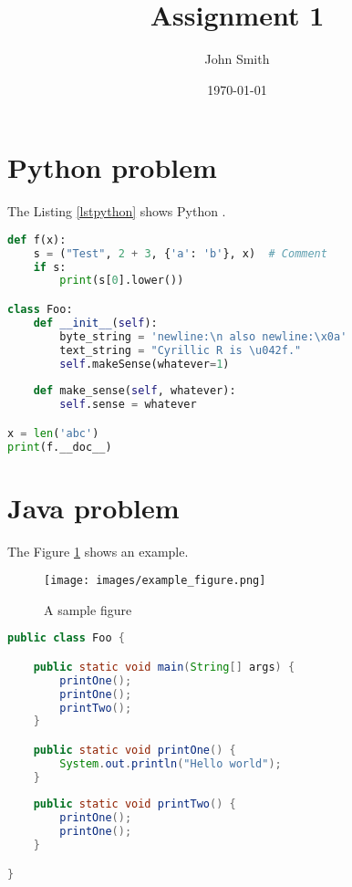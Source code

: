 \documentclass{assignment}
\institute{University of Caen}
\date{\today}
\author{John Smith}
\title{Assignment 1}
\begin{document}
\thispagestyle{plain}

\makeheader

\section{Python problem}

The Listing \ref{lstpython} shows Python .

\begin{lstlisting}[language=Python, caption=Sample Python script with highlighting, label=lstpython]
def f(x):
	s = ("Test", 2 + 3, {'a': 'b'}, x)  # Comment
	if s:
		print(s[0].lower())

class Foo:
	def __init__(self):
		byte_string = 'newline:\n also newline:\x0a'
		text_string = "Cyrillic R is \u042f."
		self.makeSense(whatever=1)
	
	def make_sense(self, whatever):
		self.sense = whatever

x = len('abc')
print(f.__doc__)
\end{lstlisting}

\lipsum[1]

\section{Java problem}

\lipsum[2]

The Figure \ref{exemple} shows an example.

\begin{figure}[H]
\centering
\texttt{[image: images/example\_figure.png]}
\caption{A sample figure}
\label{exemple}
\end{figure}

\lipsum[3]

\begin{lstlisting}[language=Java, caption=Sample Java script]
public class Foo {

    public static void main(String[] args) {
        printOne();
        printOne();
        printTwo();
    }

    public static void printOne() {
        System.out.println("Hello world");
    }
    
    public static void printTwo() {
        printOne();
        printOne();
    }

}
\end{lstlisting}

\lipsum[4]
\end{document}
